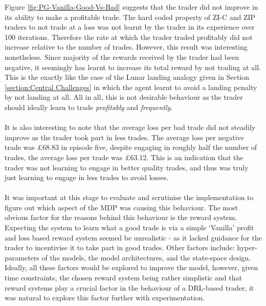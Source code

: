 \documentclass[ %
                    author={Ashwinder Khurana},
                supervisor={Prof Dave Cliff},
                    degree={MEng},
                     title={The Deeply Reinforced Trader},
                  subtitle={},
                      type={enterprise},
                      year={2020} ]{dissertation}
\begin{document}
{\noindent
Figure \ref{fig:PG-Vanilla-Good-Vs-Bad} suggests that the trader did not improve in its ability to make a profitable trade. The hard coded property of ZI-C and ZIP traders to not trade at a loss was not learnt by the trader in its experience over 100 iterations. Therefore the rate at which the trader traded profitably did not increase relative to the number of trades. However, this result was interesting nonetheless. Since majority of the rewards received by the trader had been negative, it seemingly has learnt to increase its total reward by not trading at all. This is the exactly like the case of the Lunar landing analogy given in Section \ref{section:Central Challenges} in which the agent learnt to avoid a landing penalty by not landing at all. All in all, this is not desirable behaviour as the trader should ideally learn to trade \textit{profitably} and \textit{frequently}.
\\
\\
\noindent
It is also interesting to note that the average loss per bad trade did not steadily improve as the trader took part in less trades. The average loss per negative trade was £68.83 in episode five, despite engaging in roughly half the number of trades, the average loss per trade was £63.12. This is an indication that the trader was not learning to engage in better quality trades, and thus was truly just learning to engage in less trades to avoid losses.
\\
\\
\noindent 
It was important at this stage to evaluate and scrutinise the implementation to figure out which aspect of the MDP was causing this behaviour. The most obvious factor for the reasons behind this behaviour is the reward system. Expecting the system to learn what a good trade is via a simple \enquote*{Vanilla} profit and loss based reward system seemed be unrealistic - as it lacked guidance for the trader to incentivise it to take part in good trades. Other factors include: hyper-parameters of the models, the model architectures, and the state-space design. Ideally, all these factors would be explored to improve the model, however, given time constraints, the chosen reward system being rather simplistic and that reward systems play a crucial factor in the behaviour of a DRL-based trader, it was natural to explore this factor further with experimentation.



}
\end{document}
